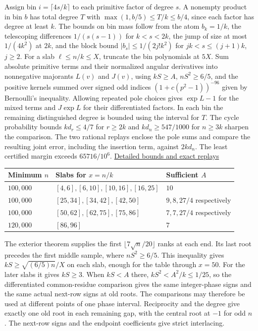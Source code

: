Assign bin \(i=\lceil 4s/k\rceil\) to each primitive factor of degree
\(s\). A nonempty product in bin \(b\) has total degree \(T\) with
\(\max(1,b/5)\le T/k\le b/4\), since each factor has degree at least
\(k\). The bounds on bin mass follow from the atom \(b_k=1/k\), the
telescoping differences \(1/(s(s-1))\) for \(k<s<2k\), the jump of
size at most \(1/(4k^2)\) at \(2k\), and the block bound
\(|b_s|\le 1/(2j!k^2)\) for \(jk<s\le(j+1)k\), \(j\ge2\).
For a slab \(\ell\le n/k\le X\), truncate the bin polynomials at
\(5X\). Sum absolute primitive terms and their normalized angular
derivatives into nonnegative majorants \(L(v)\) and \(J(v)\), using
\(kS\ge A\), \(nS^2\ge 6/5\), and the positive kernels summed over signed odd indices
\((1+c(p^2-1))^{-96}\) given by Bernoulli's inequality. Allowing
repeated pole choices gives \(\exp L-1\) for the mixed terms and
\(J\exp L\) for their differentiated factors. In each bin the
remaining distinguished degree is bounded using the interval for
\(T\). The cycle probability bounds \(kd_r\le4/7\) for \(r\ge2k\)
and \(kd_n\ge547/1000\) for \(n\ge3k\) sharpen the comparison.
The two rational replays enclose the pole sums and compare the
resulting joint error, including the insertion term, against
\(2kd_n\). The least certified margin exceeds \(65716/10^6\).
\href{https://github.com/ProgramComputer/open-math-research/tree/main/topics/long-cycle-excedances/degree-blocks}{Detailed bounds and exact replays}

\begin{center}
\begin{tabular}{lll}
Minimum \(n\) & Slabs for \(x=n/k\) & Sufficient \(A\)\\ \hline
\(100{,}000\) & \([4,6], [6,10], [10,16], [16,25]\) & \(10\)\\
\(100{,}000\) & \([25,34], [34,42], [42,50]\) & \(9,8,27/4\) respectively\\
\(100{,}000\) & \([50,62], [62,75], [75,86]\) & \(7,7,27/4\) respectively\\
\(120{,}000\) & \([86,96]\) & \(7\)
\end{tabular}
\end{center}

The exterior theorem supplies the first \(\lfloor7\sqrt n/20\rfloor\)
ranks at each end. Its last root precedes the first middle sample,
where \(nS^2\ge6/5\). This inequality gives \(kS\ge
\sqrt{(6/5)n}/X\) on each slab, enough for the table through \(x=50\).
For the later slabs it gives \(kS\ge3\). When \(kS<A\) there,
\(kS^2<A^2/k\le1/25\), so the differentiated common-residue comparison
gives the same integer-phase signs and the same actual next-row
signs at old roots. The comparisons may therefore be used at
different points of one phase interval. Reciprocity and the degree
give exactly one old root in each remaining gap, with the central
root at \(-1\) for odd \(n\). The next-row signs and the endpoint
coefficients give strict interlacing.

